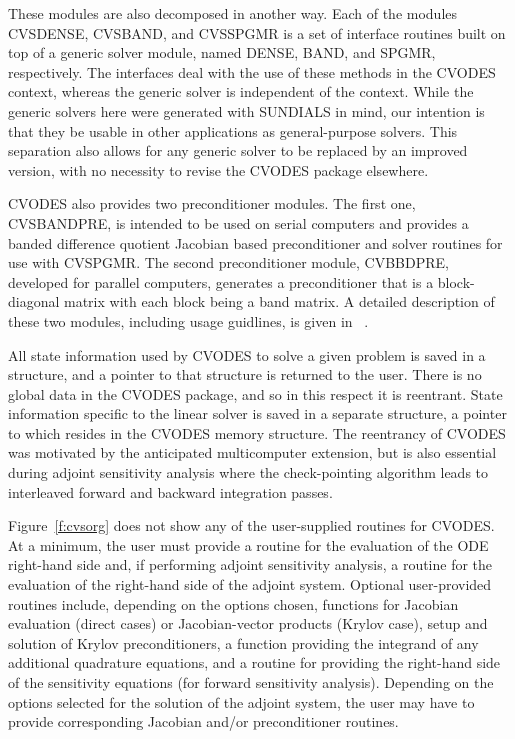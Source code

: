 These modules are also decomposed in another way.
Each of the modules CVSDENSE, CVSBAND, and CVSSPGMR is a set of 
interface routines built on top of a generic solver module, 
named DENSE, BAND, and SPGMR, respectively.  
The interfaces deal with the use of these methods in the CVODES context, 
whereas the generic solver is independent of the context.
While the generic solvers here were generated with SUNDIALS in mind, our
intention is that they be usable in other applications as
general-purpose solvers.  This separation also allows for any generic
solver to be replaced by an improved version, with no necessity to
revise the CVODES package elsewhere.

CVODES also provides two preconditioner modules. The first one, 
CVSBANDPRE, is intended to be used on serial computers and provides
a banded difference quotient Jacobian based preconditioner and solver
routines for use with CVSPGMR. The second preconditioner module, 
CVBBDPRE, developed for parallel computers, generates a 
preconditioner that is a block-diagonal matrix with each block being 
a band matrix. A detailed description of these two modules, including
usage guidlines, is given in ~\cite{HBGLSSW:03}.

All state information used by CVODES to solve a given problem is saved
in a structure, and a pointer to that structure is returned to the
user.  There is no global data in the CVODES package, and so in this
respect it is reentrant. State information specific to the linear
solver is saved in a separate structure, a pointer to which resides in
the CVODES memory structure. The reentrancy of CVODES was motivated
by the anticipated multicomputer extension, but is also essential
during adjoint sensitivity analysis where the check-pointing algorithm
leads to interleaved forward and backward integration passes. 

Figure~\ref{f:cvsorg} does not show any of the user-supplied routines 
for CVODES. At a minimum, the user must provide a routine for the evaluation 
of the ODE right-hand side and, if performing adjoint sensitivity analysis,
a routine for the evaluation of the right-hand side of the adjoint system. 
Optional user-provided routines include, depending on the options chosen, 
functions for Jacobian evaluation (direct cases) or Jacobian-vector products 
(Krylov case), setup and solution of Krylov preconditioners, a function providing 
the integrand of any additional quadrature equations, and a routine for
providing the right-hand side of the sensitivity equations (for forward sensitivity
analysis). Depending on the options selected for the solution of the adjoint
system, the user may have to provide corresponding Jacobian and/or preconditioner
routines.

